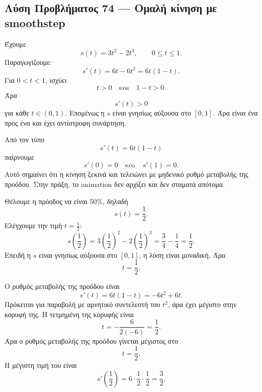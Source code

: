 \subsection*{Λύση Προβλήματος 74 --- Ομαλή κίνηση με smoothstep}

\begin{alist}
  \item Έχουμε
        \[
          s(t)=3t^2-2t^3,\qquad 0\leq t\leq1.
        \]
        Παραγωγίζουμε:
        \[
          s'(t)=6t-6t^2=6t(1-t).
        \]
        Για \(0<t<1\), ισχύει
        \[
          t>0
          \quad\text{και}\quad
          1-t>0.
        \]
        Άρα
        \[
          s'(t)>0
        \]
        για κάθε \(t\in(0,1)\). Επομένως η \(s\) είναι γνησίως αύξουσα
        στο \([0,1]\). Άρα είναι ένα προς ένα και έχει αντίστροφη
        συνάρτηση.

  \item Από τον τύπο
        \[
          s'(t)=6t(1-t)
        \]
        παίρνουμε
        \[
          s'(0)=0
          \quad\text{και}\quad
          s'(1)=0.
        \]
        Αυτό σημαίνει ότι η κίνηση ξεκινά και τελειώνει με μηδενικό
        ρυθμό μεταβολής της προόδου. Στην πράξη, το animation δεν
        αρχίζει και δεν σταματά απότομα.

  \item Θέλουμε η πρόοδος να είναι \(50\%\), δηλαδή
        \[
          s(t)=\frac12.
        \]
        Ελέγχουμε την τιμή \(t=\frac12\):
        \[
          s\!\left(\frac12\right)
          =
          3\left(\frac12\right)^2
          -
          2\left(\frac12\right)^3
          =
          \frac34-\frac14
          =
          \frac12.
        \]
        Επειδή η \(s\) είναι γνησίως αύξουσα στο \([0,1]\), η λύση
        είναι μοναδική. Άρα
        \[
          {t=\frac12}.
        \]

  \item Ο ρυθμός μεταβολής της προόδου είναι
        \[
          s'(t)=6t(1-t)=-6t^2+6t.
        \]
        Πρόκειται για παραβολή με αρνητικό συντελεστή του \(t^2\), άρα
        έχει μέγιστο στην κορυφή της. Η τετμημένη της κορυφής είναι
        \[
          t=-\frac{6}{2(-6)}=\frac12.
        \]
        Άρα ο ρυθμός μεταβολής της προόδου γίνεται μέγιστος στο
        \[
          {t=\frac12}.
        \]
        Η μέγιστη τιμή του είναι
        \[
          s'\!\left(\frac12\right)
          =
          6\cdot\frac12\cdot\frac12
          =
          \frac32.
        \]
\end{alist}

